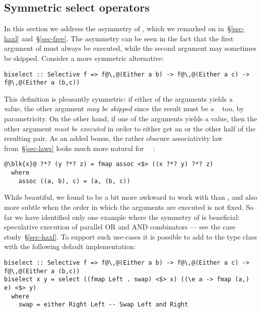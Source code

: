 \subsection{Symmetric select operators}\label{sec-alt-symmetric}

In this section we address the asymmetry of , which we remarked on
in~\S\ref{sec-haxl} and~\S\ref{sec-free}. The asymmetry can be seen in the fact
that the first argument of  must always be executed, while the second
argument may sometimes be skipped. Consider a more symmetric alternative:

\vspace{1mm}
\begin{verbatim}
biselect :: Selective f => f@\,@(Either a b) -> f@\,@(Either a c) -> f@\,@(Either a (b,c))
\end{verbatim}
\vspace{1mm}

\noindent
This definition is pleasantly symmetric: if either of the arguments yields a
~ value, the other argument \emph{may be skipped} since the
result must be a ~ too, by parametricity. On the other hand, if
one of the arguments yields a  value, then the other argument
\emph{must be executed} in order to either get an  or the other half of
the resulting pair. As an added bonus, the rather obscure associativity law
from~\S\ref{sec-laws} looks much more natural for
~\hs{=}~:

\vspace{1mm}
\begin{verbatim}
@\blk{x}@ ?*? (y ?*? z) = fmap assoc <$> ((x ?*? y) ?*? z)
  where
    assoc ((a, b), c) = (a, (b, c))
\end{verbatim}
\vspace{1mm}

\noindent
While beautiful, we found  to be a bit more awkward to work with
than , and also more subtle when the order in which the arguments
are executed is not fixed. So far we have identified only one example where the
symmetry of  is beneficial: speculative execution of parallel OR
and AND combinators --- see the \Haxl case study~\S\ref{sec-haxl}. To support
such use-cases it is possible to add  to the  type
class with the following default implementation:

\vspace{1mm}
\begin{verbatim}
biselect :: Selective f => f@\,@(Either a b) -> f@\,@(Either a c) -> f@\,@(Either a (b,c))
biselect x y = select ((fmap Left . swap) <$> x) ((\e a -> fmap (a,) e) <$> y)
  where
    swap = either Right Left -- Swap Left and Right
\end{verbatim}
\vspace{1mm}

